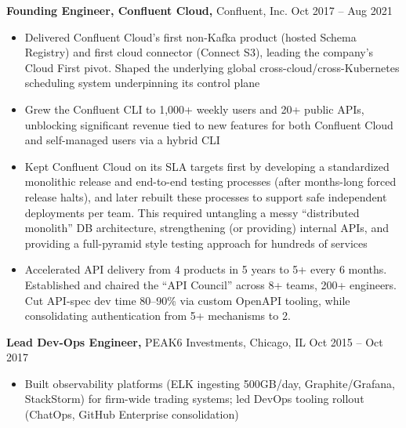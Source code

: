 \begin{resume}
{\bf Founding Engineer, Confluent Cloud,} Confluent, Inc. \hfill Oct 2017 -- Aug 2021
\nopagebreak[4]
\begin{itemize} \itemsep -2pt  %
  \item Delivered Confluent Cloud's first non-Kafka product (hosted Schema Registry) and first
        cloud connector (Connect S3), leading the company's Cloud First pivot. Shaped the underlying
        global cross-cloud/cross-Kubernetes scheduling system underpinning its control plane
  \item Grew the Confluent CLI to 1,000+ weekly users and 20+ public APIs, unblocking significant 
        revenue tied to new features for both Confluent Cloud and self-managed users via a hybrid CLI
  \item Kept Confluent Cloud on its SLA targets first by developing a standardized monolithic release
        and end-to-end testing processes (after months-long forced release halts), and later rebuilt
        these processes to support safe independent deployments per team. This required untangling
        a messy ``distributed monolith'' DB architecture, strengthening (or providing) internal APIs,
        and providing a full-pyramid style testing approach for hundreds of services
  \item Accelerated API delivery from 4 products in 5 years to 5+ every 6 months. Established and chaired
        the ``API Council'' across 8+ teams, 200+ engineers. Cut API-spec dev time 80--90\%
        via custom OpenAPI tooling, while consolidating authentication from 5+ mechanisms to 2.
 \end{itemize}

{\bf Lead Dev-Ops Engineer,} PEAK6 Investments, Chicago, IL \hfill Oct 2015 -- Oct 2017
\nopagebreak[4]
\begin{itemize} \itemsep -2pt  %
  \item Built observability platforms (ELK ingesting 500GB/day, Graphite/Grafana, StackStorm) for
        firm-wide trading systems; led DevOps tooling rollout (ChatOps, GitHub Enterprise consolidation)
 \end{itemize}


\end{resume}
